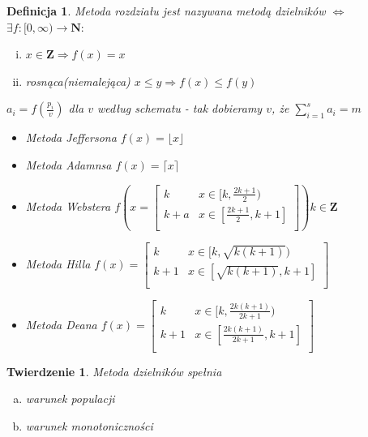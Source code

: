 \documentclass[12pt,a4paper]{article}
\theoremstyle{break}
\newtheorem{definition}{Definicja}[section]
\newtheorem{theorem}{Twierdzenie}[section]
\newcommand{\witw}{$\Leftrightarrow$}
\begin{document}
	\begin{definition}
		Metoda rozdziału jest nazywana metodą dzielników \witw $\exists f: [0,\infty) \rightarrow \mathbf{N} :$ \begin{enumerate}[i)]
			\item $ x\in \mathbf{Z}\Rightarrow f(x)=x$
			\item rosnąca(niemalejąca) $x\leq y \Rightarrow f(x)\leq f(y)$
		\end{enumerate}
		
		$a_i=f(\frac{p_i}{v})$ dla $v$ według schematu - tak dobieramy $v$, że $\sum_{i=1}^{s}a_i=m$
		\begin{itemize}
			\item Metoda Jeffersona $f(x)=\lfloor x\rfloor$
			\item Metoda Adamnsa $f(x)=\lceil x\rceil$
			\item Metoda Webstera $f(x=\begin{bmatrix}
				k& x\in [k,\frac{2k+1}{2})\\
				k+a & x \in [\frac{2k+1}{2},k+1]\\
			\end{bmatrix}) k\in \mathbf{Z}$
			
			\item Metoda Hilla $f(x)=\begin{bmatrix}
				k&x\in[k,\sqrt{k(k+1)})\\
				k+1&x\in[\sqrt{k(k+1)},k+1]\\
			\end{bmatrix}$ 
			\item Metoda Deana $f(x)= \begin{bmatrix}
				k &x\in [k, \frac{2k(k+1)}{2k+1})\\
				k+1 & x\in [\frac{2k(k+1)}{2k+1},k+1]\\
			\end{bmatrix}$
		\end{itemize}
		
	\end{definition}
	
	\begin{theorem}
		Metoda dzielników spełnia
		\begin{enumerate}[a)]
			\item warunek populacji
			\item warunek monotoniczności
		\end{enumerate}
	\end{theorem}
	
\end{document}
